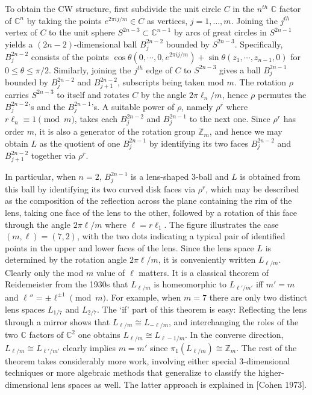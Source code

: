 To obtain the CW structure, first subdivide the unit circle $C$ in the $n^{th}$ $\mathbb{C}$ factor of $\mathbb{C}^n$ by taking the points $e^{2\pi ij/m} \in C$ as vertices, $j = 1, \ldots, m$. Joining the $j^{th}$ vertex of $C$ to the unit sphere $S^{2n-3} \subset \mathbb{C}^{n-1}$ by arcs of great circles in $S^{2n-1}$ yields a $(2n-2)$-dimensional ball $B_j^{2n-2}$ bounded by $S^{2n-3}$. Specifically, $B_j^{2n-2}$ consists of the points $\cos\theta(0, \cdots, 0, e^{2\pi ij/m}) + \sin\theta(z_1, \cdots, z_{n-1}, 0)$ for $0 \le \theta \le \pi/2$. Similarly, joining the $j^{th}$ edge of $C$ to $S^{2n-3}$ gives a ball $B_j^{2n-1}$ bounded by $B_j^{2n-2}$ and $B_{j+1}^{2n-2}$, subscripts being taken mod $m$. The rotation $\rho$ carries $S^{2n-3}$ to itself and rotates $C$ by the angle $2\pi\ell_n/m$, hence $\rho$ permutes the $B_j^{2n-2}$'s and the $B_j^{2n-1}$'s. A suitable power of $\rho$, namely $\rho^r$ where $r\ell_n \equiv 1 \pmod{m}$, takes each $B_j^{2n-2}$ and $B_j^{2n-1}$ to the next one. Since $\rho^r$ has order $m$, it is also a generator of the rotation group $\mathbb{Z}_m$, and hence we may obtain $L$ as the quotient of one $B_j^{2n-1}$ by identifying its two faces $B_j^{2n-2}$ and $B_{j+1}^{2n-2}$ together via $\rho^r$.

In particular, when $n = 2$, $B_j^{2n-1}$ is a lens-shaped 3-ball and $L$ is obtained from this ball by identifying its two curved disk faces via $\rho^r$, which may be described as the composition of the reflection across the plane containing the rim of the lens, taking one face of the lens to the other, followed by a rotation of this face through the angle $2\pi\ell/m$ where $\ell = r\ell_1$. The figure illustrates the case $(m, \ell) = (7, 2)$, with the two dots indicating a typical pair of identified points in the upper and lower faces of the lens. Since the lens space $L$ is determined by the rotation angle $2\pi\ell/m$, it is conveniently written $L_{\ell/m}$. Clearly only the mod $m$ value of $\ell$ matters. It is a classical theorem of Reidemeister from the 1930s that $L_{\ell/m}$ is homeomorphic to $L_{\ell'/m'}$ iff $m' = m$ and $\ell'' = \pm\ell^{\pm 1} \pmod{m}$. For example, when $m = 7$ there are only two distinct lens spaces $L_{1/7}$ and $L_{2/7}$. The `if' part of this theorem is easy: Reflecting the lens through a mirror shows that $L_{\ell/m} \cong L_{-\ell/m}$, and interchanging the roles of the two $\mathbb{C}$ factors of $\mathbb{C}^2$ one obtains $L_{\ell/m} \cong L_{\ell-1/m}$. In the converse direction, $L_{\ell/m} \cong L_{\ell'/m'}$ clearly implies $m = m'$ since $\pi_1(L_{\ell/m}) \cong \mathbb{Z}_m$. The rest of the theorem takes considerably more work, involving either special 3-dimensional techniques or more algebraic methods that generalize to classify the higher-dimensional lens spaces as well. The latter approach is explained in [Cohen 1973].

